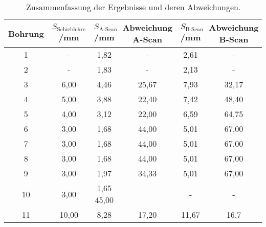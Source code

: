 \begin{table}[H]
  \centering
  \caption{Zusammenfassung der Ergebnisse und deren Abweichungen.}
  \label{tab:tab4}
    \begin{tabular}{c c c c c c}
    \toprule
    Bohrung & $S_{\text{Schieblehre}}$/\;mm & $S_{\text{A-Scan}}$/\;mm
    &Abweichung A-Scan & $S_{\text{B-Scan}}$/\;mm & Abweichung B-Scan\\
    \midrule
    1 &-     & 1,82 & -   & 2,61 & -\\
    2 & -    & 1,83& -    & 2,13 & -\\
    3 & 6,00& 4,46& 25,67 & 7,93 & 32,17\\
    4& 5,00 & 3,88& 22,40 &7,42 & 48,40\\
    5 & 4,00& 3,12& 22,00 & 6,59 & 64,75\\
    6 & 3,00& 1,68& 44,00 & 5,01 & 67,00\\
    7&  3,00& 1,68& 44,00 & 5,01 & 67,00\\
    8 & 3,00& 1,68& 44,00 & 5,01 & 67,00\\
    9 & 3,00& 1,97& 34,33 & 5,01 & 67,00\\
    10 & 3,00& 1,65 45,00 & &-   &  -\\
    11 & 10,00& 8,28& 17,20 &11,67 & 16,7\\
    \bottomrule
    \end{tabular}
  \end{table}
